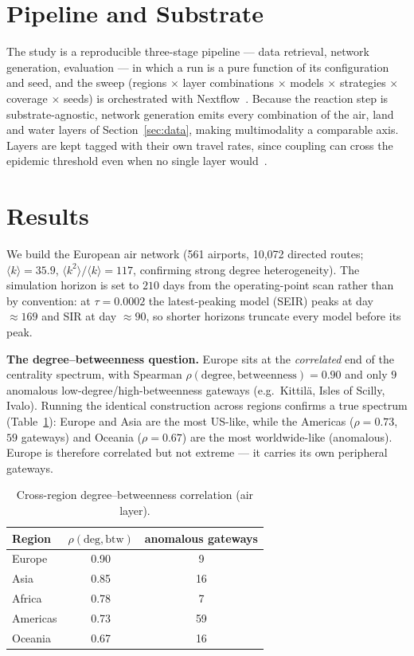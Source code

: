 \documentclass{sigkddExp}
\begin{document}
\section{Pipeline and Substrate}
\label{sec:pipeline}
The study is a reproducible three-stage pipeline --- data retrieval,
network generation, evaluation --- in which a run is a pure function of its
configuration and seed, and the sweep (regions $\times$ layer combinations
$\times$ models $\times$ strategies $\times$ coverage $\times$ seeds) is
orchestrated with Nextflow~\cite{ditommaso:nextflow}. Because the reaction
step is substrate-agnostic, network generation emits every combination of
the air, land and water layers of Section~\ref{sec:data}, making multimodality a
comparable axis. Layers are kept tagged with their own travel rates, since
coupling can cross the epidemic threshold even when no single layer
would~\cite{colizza:invasion}.

\section{Results}
\label{sec:results}
We build the European air network (561 airports, 10{,}072 directed routes;
$\langle k\rangle = 35.9$, $\langle k^2\rangle/\langle k\rangle = 117$,
confirming strong degree heterogeneity). The simulation horizon is set to
$210$ days from the operating-point scan rather than by convention: at
$\tau=0.0002$ the latest-peaking model (SEIR) peaks at day $\approx 169$
and SIR at day $\approx 90$, so shorter horizons truncate every model
before its peak.

\textbf{The degree--betweenness question.} Europe sits at the
\emph{correlated} end of the centrality spectrum, with Spearman
$\rho(\text{degree},\text{betweenness}) = 0.90$ and only $9$ anomalous
low-degree/high-betweenness gateways (e.g.\ Kittil\"a, Isles of Scilly,
Ivalo). Running the identical construction across regions confirms a true
spectrum (Table~\ref{tab:regions}): Europe and Asia are the most
US-like, while the Americas ($\rho=0.73$, $59$ gateways) and Oceania
($\rho=0.67$) are the most worldwide-like (anomalous). Europe is therefore
correlated but not extreme --- it carries its own peripheral gateways.

\begin{table}[t]
\centering
\caption{Cross-region degree--betweenness correlation (air layer).}
\label{tab:regions}
\begin{tabular}{|l|c|c|}\hline
Region & $\rho(\text{deg},\text{btw})$ & anomalous gateways\\\hline
Europe & 0.90 & 9\\\hline
Asia & 0.85 & 16\\\hline
Africa & 0.78 & 7\\\hline
Americas & 0.73 & 59\\\hline
Oceania & 0.67 & 16\\\hline
\end{tabular}
\end{table}
\end{document}
